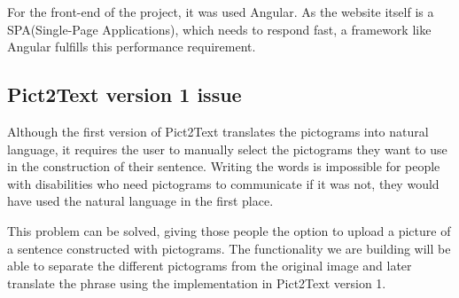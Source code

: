 For the front-end of the project, it was used Angular. As the website itself is a SPA(Single-Page Applications), which needs to respond fast, a framework like Angular fulfills this performance requirement. 

\subsection{Pict2Text version 1 issue}
Although the first version of Pict2Text translates the pictograms into natural language, it requires the user to manually select the pictograms they want to use in the construction of their sentence. Writing the words is impossible for people with disabilities who need pictograms to communicate if it was not, they would have used the natural language in the first place. 

This problem can be solved, giving those people the option to upload a picture of a sentence constructed with pictograms. The functionality we are building will be able to separate the different pictograms from the original image and later translate the phrase using the implementation in Pict2Text version 1. 




